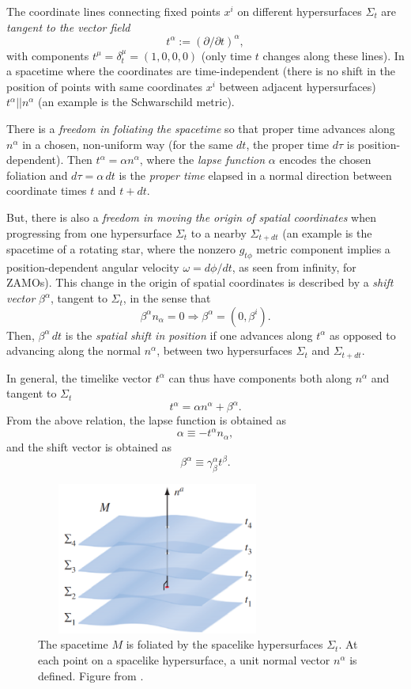 \documentclass[12pt]{article}
\def\a{\alpha}
\def\be{\begin{equation}}
\def\ee{\end{equation}}
\def\a{\alpha}
\begin{document}
{The coordinate lines connecting fixed points $x^i$ on different hypersurfaces
$\Sigma_t$ are {\it tangent to the vector field} 
\be 
\boxed{  t^\alpha := (\partial / \partial t)^\alpha
},
\ee with components
$       t^\mu = \delta_t^\mu = (1,0,0,0)$ (only time $t$ changes along these
lines). In a spacetime where the coordinates are time-independent
(there is no shift in the position of points with same coordinates $x^i$ between adjacent hypersurfaces) $t^\alpha || n^\alpha$ (an example is the Schwarschild metric). 

There is a {\it freedom in foliating the spacetime} so that proper time advances along $n^\alpha$ in a chosen, non-uniform way (for the same $dt$, the proper time $d\tau$ is position-dependent). Then $t^\alpha = \alpha n^\alpha$, where the \textit{lapse function} $\alpha$ encodes the chosen foliation and $d\tau =\alpha\, dt$ is the {\it proper time} elapsed in a normal direction between
coordinate 
times $t$ and $t+dt$.\ 

But, there is also a {\it freedom in moving the origin of spatial coordinates} when progressing from one hypersurface $\Sigma_t$ to a nearby $\Sigma_{t+dt}$ (an example is the spacetime of a rotating star, where the nonzero $g_{t\phi}$ metric component implies a position-dependent angular velocity $\omega=d\phi/dt$, as seen from infinity, for ZAMOs). This change in the origin of spatial coordinates is described by a \textit{shift vector} $\beta^\alpha$, tangent to $\Sigma_t$, in the sense that 
\be
\beta^\alpha n_\alpha = 0 \Rightarrow \beta^\alpha=(0,\beta^i).
\ee 
Then, 
$\beta^\a\, dt$ is the {\it spatial shift in position} if one advances along $t^\a$ as opposed to advancing along the normal  $n^\a$, between two hypersurfaces $\Sigma_t$ and $\Sigma_{t+dt}$. 

In general, the timelike vector $t^\a$ can thus have components both along $n^\alpha$ and tangent to $\Sigma_t$
\be
 \boxed {t^\alpha = \alpha n^\alpha + \beta^\alpha
 }.
\label{eq:ta}\ee
From the above relation, the {lapse function is obtained as}
\be
\boxed{ \alpha  \equiv - t^\alpha n_\alpha
},
\ee
and the {shift vector is obtained as}
\be
\boxed { \beta ^ { \alpha} \equiv \gamma ^{ \alpha} _ { \beta }t ^ { \beta } 
}.
\label{shift}
\ee
 
\begin{figure}
  \centering
  \includegraphics[width=8cm,height=5cm]{figs/foliation.png}
  \caption{The spacetime $M$ is foliated by the spacelike hypersurfaces $\Sigma_t$. At each point on a spacelike hypersurface, a unit normal vector $n^\alpha$ is defined. Figure from \cite{Baumgarte2010}.}
\end{figure}

}
\end{document}
